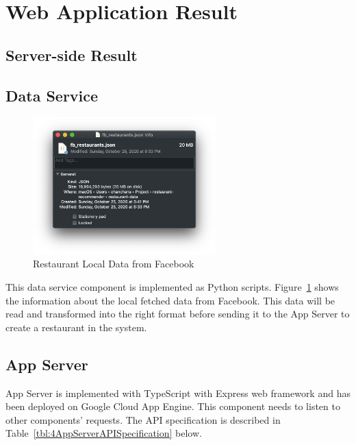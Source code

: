 \documentclass[12pt,oneside,openright,a4paper]{cpe-english-project}
\begin{document}
\section{Web Application Result}

\subsection{Server-side Result}

\subsection{Data Service}

\begin{figure}[H]\centering
\includegraphics[width=200pt]{./images/4result_dataservice.png}
\caption{Restaurant Local Data from Facebook}\label{fig:4result_dataservice}
\end{figure}\vspace{-24pt}

This data service component is implemented as Python scripts. Figure~\ref{fig:4result_dataservice} shows the information about the local fetched data from Facebook. This data will be read and transformed into the right format before sending it to the App Server to create a restaurant in the system.

\subsection{App Server}

App Server is implemented with TypeScript with Express web framework and has been deployed on Google Cloud App Engine. This component needs to listen to other components’ requests. The API specification is described in Table~\ref{tbl:4AppServerAPISpecification} below.
\end{document}
